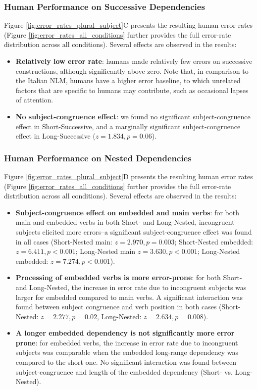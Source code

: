 \subsubsection{Human Performance on Successive Dependencies}
Figure \ref{fig:error_rates_plural_subject}C presents the resulting human error rates (Figure \ref{fig:error_rates_all_conditions} further provides the full error-rate distribution across all conditions). Several effects are observed in the results: 

\begin{itemize}
    \item \textbf{Relatively low error rate}: humans made relatively few errors on successive constructions, although significantly above zero. Note that, in comparison to the Italian NLM, humans have a higher error baseline, to which unrelated factors that are specific to humans may contribute, such as occasional lapses of attention.
    \item \textbf{No subject-congruence effect}: we found no significant subject-congruence effect in Short-Successive, and a marginally significant subject-congruence effect in Long-Successive ($z=1.834, p=0.06$).
\end{itemize}

\subsubsection{Human Performance on Nested Dependencies}
Figure \ref{fig:error_rates_plural_subject}D presents the resulting human error rates (Figure \ref{fig:error_rates_all_conditions} further provides the full error-rate distribution across all conditions). Several effects are observed in the results:

\begin{itemize}
    \item \textbf{Subject-congruence effect on embedded and main verbs}: for both main and embedded verbs in both Short- and Long-Nested, incongruent subjects elicited more errors--a significant subject-congruence effect was found in all cases (Short-Nested main: $z=2.970, p=0.003$; Short-Nested embedded: $z=6.411, p<0.001$; Long-Nested main $z=3.630, p<0.001$; Long-Nested embedded: $z=7.274, p<0.001$).
    \item \textbf{Processing of embedded verbs is more error-prone}: for both Short- and Long-Nested, the increase in error rate due to incongruent subjects was larger for embedded compared to main verbs. A significant interaction was found between subject congruence and verb position in both cases (Short-Nested: $z=2.277, p = 0.02$, Long-Nested: $z=2.634, p = 0.008$).
    \item \textbf{A longer embedded dependency is not significantly more error prone}: for embedded verbs, the increase in error rate due to incongruent subjects was comparable when the embedded long-range dependency was compared to the short one. No significant interaction was found between subject-congruence and length of the embedded dependency (Short- vs. Long-Nested).
\end{itemize}

